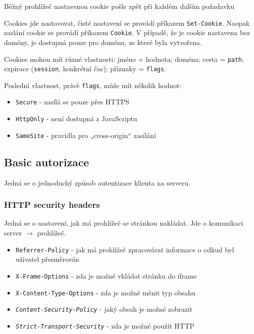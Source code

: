 \documentclass[10pt,a4paper]{article}
\begin{document}
Běžný prohlížeč nastavenou cookie pošle zpět při každém dalším požadavku


Cookies jde nastavovat, čisté nastavení se provádí příkazem \texttt{Set-Cookie}.
Naopak zaslání cookie se provádí příkazem \texttt{Cookie}.
V případě, že je cookie nastavena bez domény, je dostupná pouze pro doménu, ze které byla vytvořena.

Cookies mohou mít různé vlastnosti: jméno + hodnota; doména; cesta = \texttt{path}; expirace (\texttt{session}, konkrétní čas); příznaky = \texttt{flags}.

Poslední vlastnost, právě \texttt{flags}, může mít několik hodnot:
\begin{itemize}\setlength\itemsep{0em}
    \item \texttt{Secure} - zasílá se pouze přes HTTPS
    \item \texttt{HttpOnly} - není dostupná z JavaScriptu
    \item \texttt{SameSite} - pravidla pro „cross-origin“ zasílání
\end{itemize}


\subsection{Basic autorizace}

Jedná se o jednoduchý způsob autentizace klienta na serveru.


\subsubsection*{HTTP security headers}

Jedná se o nastavení, jak má prohlížeč se stránkou nakládat. Jde o komunikaci server $\to$ prohlížeč.

\begin{itemize}\setlength\itemsep{0em}
    \item \texttt{Referrer-Policy} - jak má prohlížeč zpracovávat informace o odkud byl uživatel přesměrován
    \item \texttt{X-Frame-Options} - zda je možné vkládat stránku do iframe
    \item \texttt{X-Content-Type-Options} - zda je možné měnit typ obsahu
    \item \textit{\texttt{Content-Security-Policy}} - jaký obsah je možné zobrazit
    \item \textit{\texttt{Strict-Transport-Security}} - zda je možné použít HTTP
\end{itemize}
\end{document}
